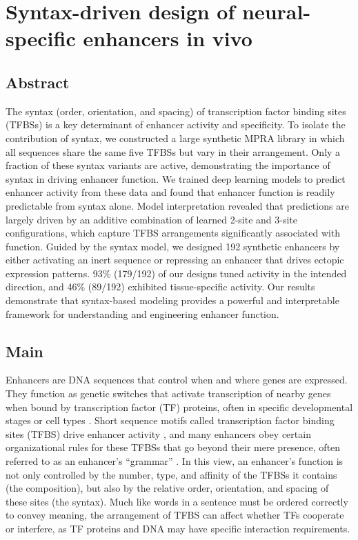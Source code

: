 \chapter{Syntax-driven design of neural-specific enhancers in vivo}
\label{chap:chapter 2}

\section{Abstract}

The syntax (order, orientation, and spacing) of transcription factor binding sites (TFBSs) is a key determinant of enhancer activity and specificity. To isolate the contribution of syntax, we constructed a large synthetic MPRA library in which all sequences share the same five TFBSs but vary in their arrangement. Only a fraction of these syntax variants are active, demonstrating the importance of syntax in driving enhancer function. We trained deep learning models to predict enhancer activity from these data and found that enhancer function is readily predictable from syntax alone. Model interpretation revealed that predictions are largely driven by an additive combination of learned 2-site and 3-site configurations, which capture TFBS arrangements significantly associated with function. Guided by the syntax model, we designed 192 synthetic enhancers by either activating an inert sequence or repressing an enhancer that drives ectopic expression patterns. 93\% (179/192) of our designs tuned activity in the intended direction, and 46\% (89/192) exhibited tissue-specific activity. Our results demonstrate that syntax-based modeling provides a powerful and interpretable framework for understanding and engineering enhancer function.

\section{Main}

Enhancers are DNA sequences that control when and where genes are expressed. They function as genetic switches that activate transcription of nearby genes when bound by transcription factor (TF) proteins, often in specific developmental stages or cell types \cite{Levine2010-ry}. Short sequence motifs called transcription factor binding sites (TFBS) drive enhancer activity \cite{Stormo2010-xm}, and many enhancers obey certain organizational rules for these TFBSs that go beyond their mere presence, often referred to as an enhancer’s “grammar” \cite{Jindal2021-zk}. In this view, an enhancer’s function is not only controlled by the number, type, and affinity of the TFBSs it contains (the composition), but also by the relative order, orientation, and spacing of these sites (the syntax). Much like words in a sentence must be ordered correctly to convey meaning, the arrangement of TFBS can affect whether TFs cooperate or interfere, as TF proteins and DNA may have specific interaction requirements.

